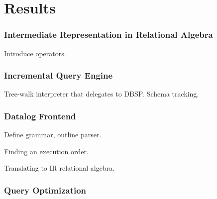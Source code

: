 
\chapter{Results}\label{ch:results}

\subsection{Intermediate Representation in Relational Algebra}

Introduce operators.

\subsection{Incremental Query Engine}

Tree-walk interpreter that delegates to DBSP. Schema tracking.

\subsection{Datalog Frontend}

Define grammar, outline parser.

Finding an execution order.

Translating to IR relational algebra.

\subsection{Query Optimization}
